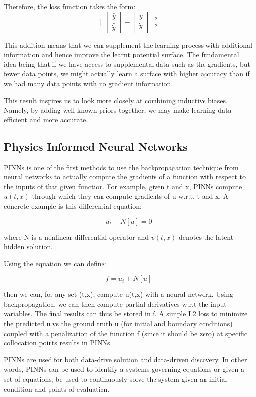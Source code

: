 \documentclass{article}
\begin{document}
Therefore, the loss function takes the form:
$$
\Bigg\|
\begin{bmatrix}
\hat{y} \\
\hat{\dot{y}}
\end{bmatrix}
-
\begin{bmatrix}
y \\
\dot{y}
\end{bmatrix}
\Bigg\|_2^2
$$

This addition means that we can supplement the learning process with additional information and hence improve the learnt potential surface. The fundamental idea being that if we have access to supplemental data such as the gradients, but fewer data points, we might actually learn a surface with higher accuracy than if we had many data points with no gradient information. 

This result inspires us to look more closely at combining inductive biases. Namely, by adding well known priors together, we may make learning data-efficient and more accurate.

\subsection{Physics Informed Neural Networks}

PINNs is one of the first methods to use the backpropagation technique from neural networks to actually compute the gradients of a function with respect to the inputs of that given function. For example, given t and x, PINNs compute $u(t,x)$ through which they can compute gradients of u w.r.t. t and x. A concrete example is this differential equation:


$$ u_t + N[u] = 0$$

where N is a nonlinear differential operator and $u(t,x)$ denotes the latent hidden solution.

Using the equation we can define:

$$ f = u_t +N[u] $$

then we can, for any set (t,x), compute u(t,x) with a neural network. Using backpropagation, we can then compute partial derivatives w.r.t the input variables. The final results can thus be stored in f. A simple L2 loss to minimize the predicted u vs the ground truth u (for initial and boundary conditions) coupled with a penalization of the function f (since it should be zero) at specific collocation points results in PINNs.

PINNs are used for both data-drive solution and data-driven discovery. In other words, PINNs can be used to identify a systems governing equations or given a set of equations, be used to continuously solve the system given an initial condition and points of evaluation.
\end{document}
